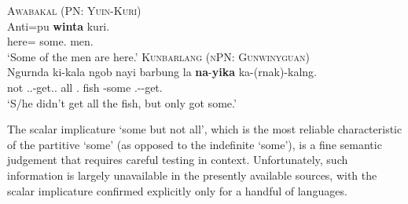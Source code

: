 \documentclass[12pt,egregdoesnotlikesansseriftitles]{scrartcl}
\begin{document}
\begin{exe}
  \ex\label{ex:specsmawa} \textsc{Awabakal (PN: Yuin-Kuri)}\hfill {}\\
  \gll Anti=pu \textbf{winta} kuri.\\
  here=\Excl{} some.\Abs{} men.\Abs\\
  \glt `Some of the men are here.' %
  \ex\label{ex:specsmwlg} \textsc{Kunbarlang (nPN: Gunwinyguan)}\hfill \citep{ikthesis}\\
  \gll Ngurnda ki-kala ngob nayi barbung la \textbf{na}-\textbf{yika} ka-(rnak)-kalng.\\
  not \Tsg.\Irr.\Pst-get.\Irr.\Pst{} all \Nm.\Cli{} fish \Conj{} \Cli-some \Tsg.\Nfut-\Lim-get.\Pst\\
  \glt `S/he didn't get all the fish, but only got some.' %
\end{exe}

The scalar implicature `some but not all', which is the most reliable characteristic of the partitive `some' (as opposed to the indefinite `some'), is a fine semantic judgement that requires careful testing in context. Unfortunately, such information is largely unavailable in the presently available sources, with the scalar implicature confirmed explicitly only for a handful of languages. %

\end{document}
